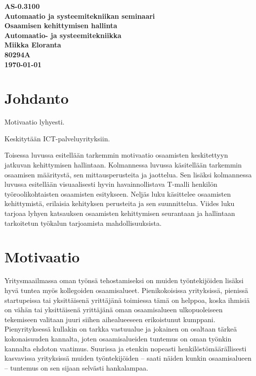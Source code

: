 \documentclass[a4paper,finnish,12pt]{article}
\begin{document}
\thispagestyle{empty}

\begin{titlepage}
    \centering
    \vspace*{10\baselineskip}
    \Large
    \bfseries
    AS-0.3100 \\ Automaatio ja systeemitekniikan seminaari \\
    \vspace{\baselineskip}
    \huge
    Osaamisen kehittymisen hallinta \\
    [1.5\baselineskip]
    \normalfont
    \vfill
    \small
    Automaatio- ja systeemitekniikka \\
    \vfill
    Miikka Eloranta \\
    80294A \\[2\baselineskip]
    \textbf{\today} \\[2\baselineskip]
    \vfill


\end{titlepage}


\pagebreak

\tableofcontents

\pagebreak

\section{Johdanto}

Motivaatio lyhyesti.

Keskitytään ICT-palveluyrityksiin.

Toisessa luvussa esitellään tarkemmin motivaatio osaamisten keskitettyyn jatkuvan kehittymisen hallintaan. Kolmannessa luvussa käsitellään tarkemmin osaamisen määritystä, sen mittausperusteita ja jaottelua. Sen lisäksi kolmannessa luvussa esitellään visuaalisesti hyvin havainnollistava T-malli henkilön työroolikohtaisten osaamisten esitykseen. Neljäs luku käsittelee osaamisten kehittymistä, erilaisia kehityksen perusteita ja sen suunnittelua. Viides luku tarjoaa lyhyen katsauksen osaamisten kehittymisen seurantaan ja hallintaan tarkoitetun työkalun tarjoamista mahdollisuuksista.

\pagebreak

\section{Motivaatio}

Yritysmaailmassa oman työnsä tehostamiseksi on muiden työntekijöiden lisäksi hyvä tuntea myös kollegoiden osaamisalueet. Pienikokoisissa yrityksissä, pienissä startupeissa tai yksittäisenä yrittäjänä toimiessa tämä on helppoa, koska ihmisiä on vähän tai yksittäisenä yrittäjänä oman osaamisalueen ulkopuoleiseen tekemiseen valitaan juuri siihen aihealueeseen erikoistunut kumppani. Pienyrityksessä kullakin on tarkka vastuualue ja jokainen on osaltaan tärkeä kokonaisuuden kannalta, joten osaamisalueiden tuntemus on oman työnkin kannalta ehdoton vaatimus. Suurissa ja etenkin nopeasti henkilöstömäärällisesti kasvavissa yrityksissä muiden työntekijöiden -- saati näiden kunkin osaamisalueen -- tuntemus on sen sijaan selvästi hankalampaa.
\end{document}
